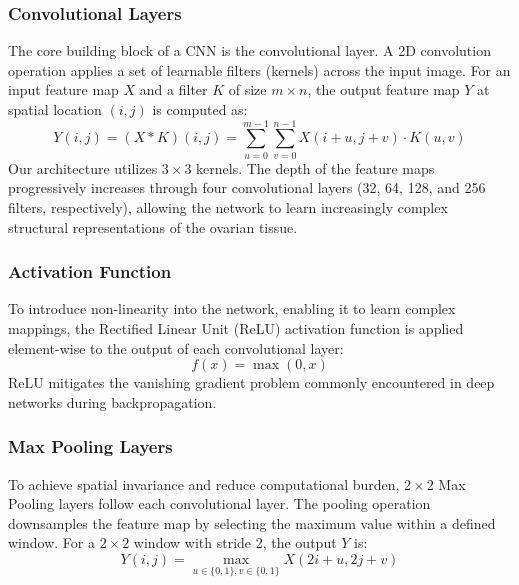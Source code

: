 \documentclass[conference]{IEEEtran}
\begin{document}
\subsubsection{Convolutional Layers}
The core building block of a CNN is the convolutional layer. A 2D convolution operation applies a set of learnable filters (kernels) across the input image. For an input feature map $X$ and a filter $K$ of size $m \times n$, the output feature map $Y$ at spatial location $(i, j)$ is computed as:
\begin{equation}
    Y(i, j) = (X * K)(i, j) = \sum_{u=0}^{m-1} \sum_{v=0}^{n-1} X(i+u, j+v) \cdot K(u, v)
\end{equation}
Our architecture utilizes $3 \times 3$ kernels. The depth of the feature maps progressively increases through four convolutional layers (32, 64, 128, and 256 filters, respectively), allowing the network to learn increasingly complex structural representations of the ovarian tissue.

\subsubsection{Activation Function}
To introduce non-linearity into the network, enabling it to learn complex mappings, the Rectified Linear Unit (ReLU) activation function is applied element-wise to the output of each convolutional layer:
\begin{equation}
    f(x) = \max(0, x)
\end{equation}
ReLU mitigates the vanishing gradient problem commonly encountered in deep networks during backpropagation.

\subsubsection{Max Pooling Layers}
To achieve spatial invariance and reduce computational burden, $2 \times 2$ Max Pooling layers follow each convolutional layer. The pooling operation downsamples the feature map by selecting the maximum value within a defined window. For a $2 \times 2$ window with stride 2, the output $Y$ is:
\begin{equation}
    Y(i, j) = \max_{u \in \{0, 1\}, v \in \{0, 1\}} X(2i+u, 2j+v)
\end{equation}
\end{document}
